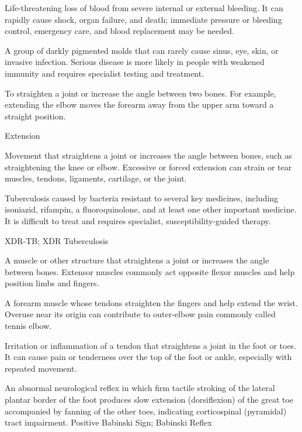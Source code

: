  Life-threatening loss of blood from severe internal or external bleeding. It can rapidly cause shock, organ failure, and death; immediate pressure or bleeding control, emergency care, and blood replacement may be needed.

 A group of darkly pigmented molds that can rarely cause sinus, eye, skin, or invasive infection. Serious disease is more likely in people with weakened immunity and requires specialist testing and treatment.

 To straighten a joint or increase the angle between two bones. For example, extending the elbow moves the forearm away from the upper arm toward a straight position.

\synonyms
Extension

 Movement that straightens a joint or increases the angle between bones, such as straightening the knee or elbow. Excessive or forced extension can strain or tear muscles, tendons, ligaments, cartilage, or the joint.

 Tuberculosis caused by bacteria resistant to several key medicines, including isoniazid, rifampin, a fluoroquinolone, and at least one other important medicine. It is difficult to treat and requires specialist, susceptibility-guided therapy.

\synonyms
XDR-TB; XDR Tuberculosis

 A muscle or other structure that straightens a joint or increases the angle between bones. Extensor muscles commonly act opposite flexor muscles and help position limbs and fingers.

 A forearm muscle whose tendons straighten the fingers and help extend the wrist. Overuse near its origin can contribute to outer-elbow pain commonly called tennis elbow.

 Irritation or inflammation of a tendon that straightens a joint in the foot or toes. It can cause pain or tenderness over the top of the foot or ankle, especially with repeated movement.

 An abnormal neurological reflex in which firm tactile stroking of the lateral plantar border of the foot produces slow extension (dorsiflexion) of the great toe accompanied by fanning of the other toes, indicating corticospinal (pyramidal) tract impairment.
\synonyms
Positive Babinski Sign; Babinski Reflex

